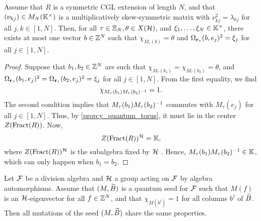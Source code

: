 \begin{lemma}\label{lem:unique_b}
	Assume that $R$ is a symmetric CGL extension of length $N$, and that $(\nu_{kj}) \in M_N(\mathbb{K}^\times)$ is a multiplicatively skew-symmetric matrix with $\nu_{kj}^2 = \lambda_{kj}$ for all $j,k \in [1, N]$. Then, for all $\tau \in \Xi_N, \theta \in X(\mathcal{H})$, and $\xi_1, \dots, \xi_N \in \mathbb{K}^\times$, there exists at most one vector $b\in \mathbb{Z}^N$ such that $\chi_{M_\tau(b)} = \theta$ and $\Omega_{\mathbf{r}_\tau}(b, e_j)^2 = \xi_j$ for all $j \in [1, N]$.
\end{lemma}
\begin{proof}
	Suppose that $b_1, b_2 \in \mathbb{Z}^N$ are such that $\chi_{M_\tau(b_1)} = \chi_{M_\tau(b_2)} = \theta$, and $\Omega_{\mathbf{r}_\tau}(b_1, e_j)^2 = \Omega_{\mathbf{r}_\tau}(b_2, e_j)^2 = \xi_j$ for all $j \in [1, N]$. From the first equality, we find
	\begin{equation*}
		\chi_{M_\tau(b_1)M_\tau(b_2)^{-1}} = 1.
	\end{equation*}
	The second condition implies that $M_\tau(b_1)M_\tau(b_2)^{-1}$ commutes with
	$M_\tau(e_j)$ for all $j\in [1, N]$. Thus, by \cref{prop:y_quantum_torus}, it must lie
	in the center $Z(\operatorname{Fract}(R))$. Now,
	\begin{equation*}
		Z(\operatorname{Fract}(R))^{\mathcal{H}} = \mathbb{K},
	\end{equation*}
	where $Z(\operatorname{Fract}(R))^{\mathcal{H}}$ is the subalgebra fixed by $\mathcal{H}$ \cite[Theorem II.6.4]{GoodearlBrown2002LecturesAQC}. Hence, $M_\tau(b_1)M_\tau(b_2)^{-1} \in \mathbb{K}$, which can only happen when $b_1 = b_2$.
\end{proof}
\begin{lemma}\label{lem:equivariance_mutations}

	Let $\mathcal{F}$ be a division algebra and $\mathcal{H}$ a group acting on $\mathcal{F}$ by algebra
	automorphisms. Assume that $(M, \widetilde{B})$ is a quantum seed for $\mathcal{F}$ such that $M(f)$ is
	an $\mathcal{H}$-eigenvector for all $f \in \mathbb{Z}^N$, and that $\chi_{M(b^j)} = 1$ for all
	columns $b^j$ of $\widetilde{B}$. Then all mutations of the seed $(M, \widetilde{B})$ share the same
	properties.
\end{lemma}
